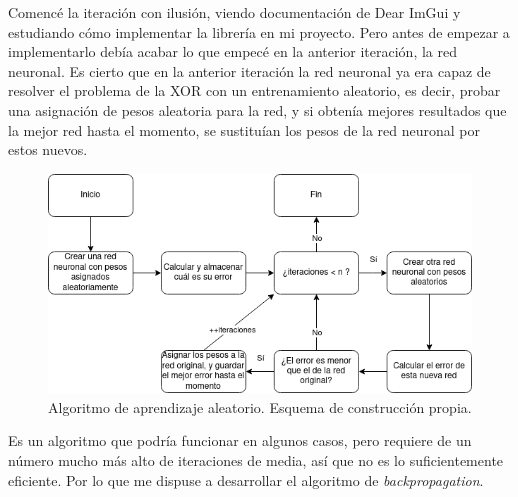 Comencé la iteración con ilusión, viendo documentación de Dear ImGui y estudiando cómo implementar la librería en mi proyecto. Pero antes de empezar a implementarlo debía acabar lo que empecé en la anterior iteración, la red neuronal. Es cierto que en la anterior iteración la red neuronal ya era capaz de resolver el problema de la XOR con un entrenamiento aleatorio, es decir, probar una asignación de pesos aleatoria para la red, y si obtenía mejores resultados que la mejor red hasta el momento, se sustituían los pesos de la red neuronal por estos nuevos.
\begin{figure}[H]
	\centering
	\includegraphics[width=15cm]{archivos/imagenes/Algoritmo-red-neuronal-aleatorio.png}
	\caption{Algoritmo de aprendizaje aleatorio. Esquema de construcción propia.}
	\label{Algoritmo aleatorio}
\end{figure}
Es un algoritmo que podría funcionar en algunos casos, pero requiere de un número mucho más alto de iteraciones de media, así que no es lo suficientemente eficiente. Por lo que me dispuse a desarrollar el algoritmo de \textit{backpropagation}.

